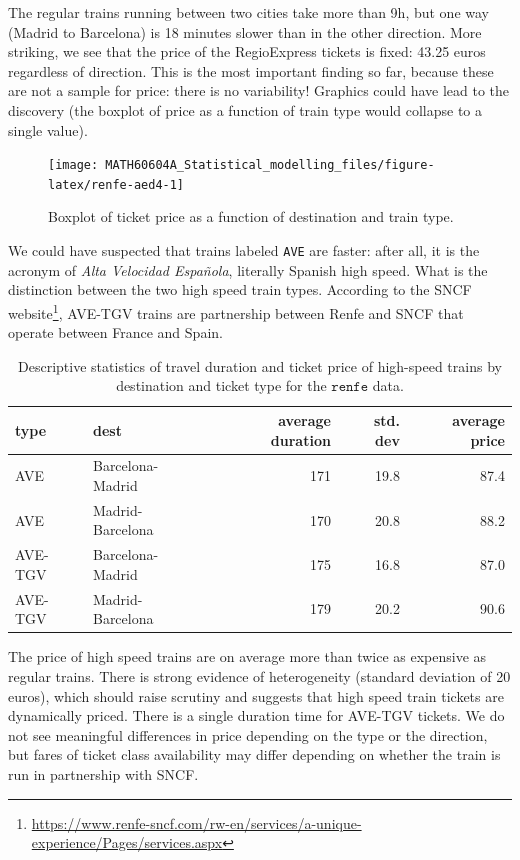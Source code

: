 \documentclass[
  11pt,
  letterpaper,
]{book}
\renewcommand{\href}[2]{#2\footnote{\url{#1}}}
\theoremstyle{definition}
\theoremstyle{definition}
\theoremstyle{definition}
\theoremstyle{definition}
\theoremstyle{remark}
\begin{document}
The regular trains running between two cities take more than 9h, but one way (Madrid to Barcelona) is 18 minutes slower than in the other direction. More striking, we see that the price of the RegioExpress tickets is fixed: 43.25 euros regardless of direction. This is the most important finding so far, because these are not a sample for price: there is no variability! Graphics could have lead to the discovery (the boxplot of price as a function of train type would collapse to a single value).

\begin{figure}

{\centering \texttt{[image: MATH60604A\_Statistical\_modelling\_files/figure-latex/renfe-aed4-1]} 

}

\caption{Boxplot of ticket price as a function of destination and train type.}\label{fig:renfe-aed4}
\end{figure}

We could have suspected that trains labeled \texttt{AVE} are faster: after all, it is the acronym of \emph{Alta Velocidad Española}, literally Spanish high speed. What is the distinction between the two high speed train types. According to the \href{https://www.renfe-sncf.com/rw-en/services/a-unique-experience/Pages/services.aspx}{SNCF website}, AVE-TGV trains are partnership between Renfe and SNCF that operate between France and Spain.

\begin{table}

\caption{\label{tab:renfe-aed5}Descriptive statistics of travel duration and ticket price of high-speed trains by destination and ticket type for the $\texttt{renfe}$ data.}
\centering
\begin{tabular}[t]{llrrr}
\toprule
type & dest & average duration & std. dev & average price\\
\midrule
AVE & Barcelona-Madrid & 171 & 19.8 & 87.4\\
AVE & Madrid-Barcelona & 170 & 20.8 & 88.2\\
AVE-TGV & Barcelona-Madrid & 175 & 16.8 & 87.0\\
AVE-TGV & Madrid-Barcelona & 179 & 20.2 & 90.6\\
\bottomrule
\end{tabular}
\end{table}

The price of high speed trains are on average more than twice as expensive as regular trains. There is strong evidence of heterogeneity (standard deviation of 20 euros), which should raise scrutiny and suggests that high speed train tickets are dynamically priced. There is a single duration time for AVE-TGV tickets. We do not see meaningful differences in price depending on the type or the direction, but fares of ticket class availability may differ depending on whether the train is run in partnership with SNCF.
\end{document}
